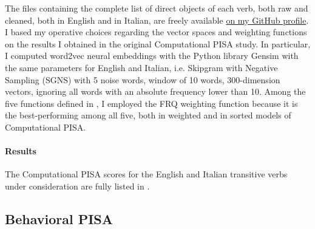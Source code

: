 The files containing the complete list of direct objects of each verb, both raw and cleaned, both in English and in Italian, are freely available \href{https://github.com/giuliacappelli/dissertationData}{on my GitHub profile}.\\
I based my operative choices regarding the vector spaces and weighting functions on the results I obtained in the original Computational PISA study. In particular, I computed word2vec neural embeddings with the Python library Gensim with the same parameters for English and Italian, i.e. Skipgram with Negative Sampling (SGNS) with 5 noise words, window of 10 words, 300-dimension vectors, ignoring all words with an absolute frequency lower than 10. Among the five functions defined in \textcite{CappelliLenciPISA}, I employed the FRQ weighting function because it is the best-performing among all five, both in weighted and in sorted models of Computational PISA.

\paragraph{Results}
The Computational PISA scores for the English and Italian transitive verbs under consideration are fully listed in .\\ %


\subsection{Behavioral PISA}

